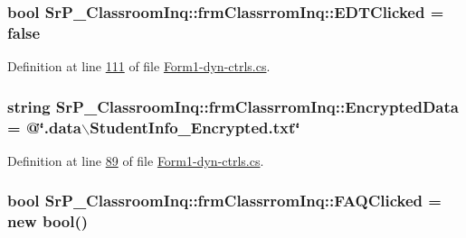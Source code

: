 \hypertarget{class_sr_p___classroom_inq_1_1frm_classrrom_inq_a2f126b875f216c20427f6818976a9465}{
\subsubsection[{\-E\-D\-T\-Clicked}]{\setlength{\rightskip}{0pt plus 5cm}bool {\bf \-Sr\-P\-\_\-\-Classroom\-Inq\-::frm\-Classrrom\-Inq\-::\-E\-D\-T\-Clicked} = false}}
\label{class_sr_p___classroom_inq_1_1frm_classrrom_inq_a2f126b875f216c20427f6818976a9465}


\-Definition at line \hyperlink{_form1-dyn-ctrls_8cs_source_l00111}{111} of file \hyperlink{_form1-dyn-ctrls_8cs_source}{\-Form1-\/dyn-\/ctrls.\-cs}.

\hypertarget{class_sr_p___classroom_inq_1_1frm_classrrom_inq_a3128c84ccd476a8a2e02bedab0ecc031}{
\subsubsection[{\-Encrypted\-Data}]{\setlength{\rightskip}{0pt plus 5cm}string {\bf \-Sr\-P\-\_\-\-Classroom\-Inq\-::frm\-Classrrom\-Inq\-::\-Encrypted\-Data} = @\char`\"{}.data$\backslash$\-Student\-Info\-\_\-\-Encrypted.\-txt\char`\"{}}}
\label{class_sr_p___classroom_inq_1_1frm_classrrom_inq_a3128c84ccd476a8a2e02bedab0ecc031}


\-Definition at line \hyperlink{_form1-dyn-ctrls_8cs_source_l00089}{89} of file \hyperlink{_form1-dyn-ctrls_8cs_source}{\-Form1-\/dyn-\/ctrls.\-cs}.

\hypertarget{class_sr_p___classroom_inq_1_1frm_classrrom_inq_a2b3fd84c890215dd61c54946b49906d2}{
\subsubsection[{\-F\-A\-Q\-Clicked}]{\setlength{\rightskip}{0pt plus 5cm}bool {\bf \-Sr\-P\-\_\-\-Classroom\-Inq\-::frm\-Classrrom\-Inq\-::\-F\-A\-Q\-Clicked} = new bool()}}
\label{class_sr_p___classroom_inq_1_1frm_classrrom_inq_a2b3fd84c890215dd61c54946b49906d2}


